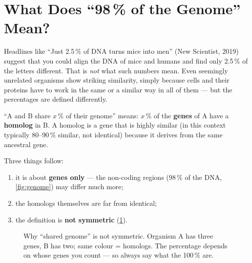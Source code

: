\documentclass[11pt, oneside]{book}
\let\originalsection\section
\renewcommand{\section}{\Needspace{7\baselineskip}\originalsection}
\begin{document}
\section{What Does ``98\,\% of the Genome'' Mean?}

Headlines like ``Just 2.5\,\% of DNA turns mice into men'' (New Scientist,
2019) suggest that you could align the DNA of mice and humans and find only
2.5\,\% of the letters different. That is \emph{not} what such numbers mean.
Even seemingly unrelated organisms show striking similarity, simply because
cells and their proteins have to work in the same or a similar way in all of
them --- but the percentages are defined differently.

\begin{defbox}[title={Shared genome (the most widely accepted definition)}]
``A and B share $x\,\%$ of their genome'' means: $x\,\%$ of the \textbf{genes}
of A have a \textbf{homolog} in B. A homolog is a gene that is highly similar
(in this context typically 80--90\,\% similar, not identical) because it
derives from the same ancestral gene.
\end{defbox}

Three things follow:
\begin{enumerate}
  \item it is about \textbf{genes only} --- the non-coding regions (98\,\% of
    the DNA, \cref{fig:genome}) may differ much more;
  \item the homologs themselves are far from identical;
  \item the definition is \textbf{not symmetric} (\cref{fig:homologs}).
\end{enumerate}

\begin{figure}[htbp]
\centering
{}
\caption{Why ``shared genome'' is not symmetric. Organism A has three genes,
B has two; same colour = homologs. The percentage depends on whose genes
you count --- so always say what the 100\,\% are.}
\label{fig:homologs}
\end{figure}
\end{document}
